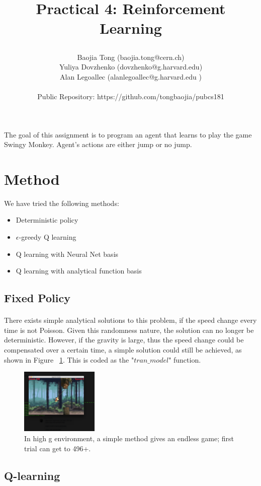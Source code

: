 \documentclass[11pt]{article}
\title{\begin{center}
{\Large Practical 4: Reinforcement Learning}
\end{center}}
\author{ Baojia Tong (baojia.tong@cern.ch)\\Yuliya Dovzhenko (dovzhenko@g.harvard.edu)\\Alan Legoallec (alanlegoallec@g.harvard.edu )\\\\Public Repository: https://github.com/tongbaojia/pubcs181}
\begin{document}
\maketitle{}
The goal of this assignment is to program an agent that learns to play the game Swingy Monkey. Agent's actions are either jump or no jump. 
\section{Method}
We have tried the following methods:
\begin{itemize}
\item Deterministic policy
\item $\epsilon$-greedy Q learning
\item Q learning with Neural Net basis
\item Q learning with analytical function basis
\end{itemize}
\subsection{Fixed Policy}
\paragraph{}
There exists simple analytical solutions to this problem, if the speed change every time is not Poisson. Given this randomness nature, the solution can no longer be deterministic. However, if the gravity is large, thus the speed change could be compensated over a certain time, a simple solution could still be achieved, as shown in Figure ~\ref{FixedPolicy}. This is coded as the "$tran\_model$" function.
\begin{figure}[] 
\centering
        \includegraphics[width=0.33\textwidth]{Plot/highscore.png}
        \caption{In high g environment, a simple method gives an endless game; first trial can get to 496+.}
            \label{FixedPolicy}
\end{figure}

\subsection{Q-learning}
\end{document}
